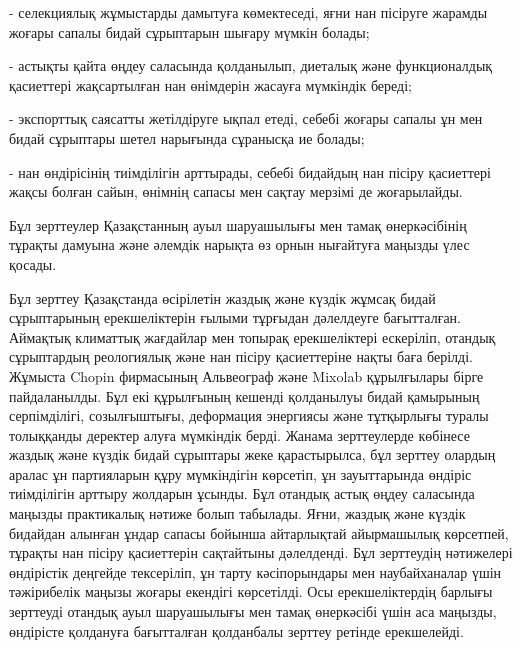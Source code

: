 \begin{multicols}{2}
- селекциялық жұмыстарды дамытуға көмектеседі, яғни нан пісіруге жарамды
жоғары сапалы бидай сұрыптарын шығару мүмкін болады;

- астықты қайта өңдеу саласында қолданылып, диеталық және функционалдық
қасиеттері жақсартылған нан өнімдерін жасауға мүмкіндік береді;

- экспорттық саясатты жетілдіруге ықпал етеді, себебі жоғары сапалы ұн
мен бидай сұрыптары шетел нарығында сұранысқа ие болады;

- нан өндірісінің тиімділігін арттырады, себебі бидайдың нан пісіру
қасиеттері жақсы болған сайын, өнімнің сапасы мен сақтау мерзімі де
жоғарылайды.

Бұл зерттеулер Қазақстанның ауыл шаруашылығы мен тамақ өнеркәсібінің
тұрақты дамуына және әлемдік нарықта өз орнын нығайтуға маңызды үлес
қосады.

Бұл зерттеу Қазақстанда өсірілетін жаздық және күздік жұмсақ бидай
сұрыптарының ерекшеліктерін ғылыми тұрғыдан дәлелдеуге бағытталған.
Аймақтық климаттық жағдайлар мен топырақ ерекшеліктері ескеріліп,
отандық сұрыптардың реологиялық және нан пісіру қасиеттеріне нақты баға
берілді. Жұмыста Chopin фирмасының Альвеограф және Mixolab құрылғылары
бірге пайдаланылды. Бұл екі құрылғының кешенді қолданылуы бидай
қамырының серпімділігі, созылғыштығы, деформация энергиясы және
тұтқырлығы туралы толыққанды деректер алуға мүмкіндік берді. Жанама
зерттеулерде көбінесе жаздық және күздік бидай сұрыптары жеке
қарастырылса, бұл зерттеу олардың аралас ұн партияларын құру мүмкіндігін
көрсетіп, ұн зауыттарында өндіріс тиімділігін арттыру жолдарын ұсынды.
Бұл отандық астық өңдеу саласында маңызды практикалық нәтиже болып
табылады. Яғни, жаздық және күздік бидайдан алынған ұндар сапасы бойынша
айтарлықтай айырмашылық көрсетпей, тұрақты нан пісіру қасиеттерін
сақтайтыны дәлелденді. Бұл зерттеудің нәтижелері өндірістік деңгейде
тексеріліп, ұн тарту кәсіпорындары мен наубайханалар үшін тәжірибелік
маңызы жоғары екендігі көрсетілді. Осы ерекшеліктердің барлығы зерттеуді
отандық ауыл шаруашылығы мен тамақ өнеркәсібі үшін аса маңызды,
өндірісте қолдануға бағытталған қолданбалы зерттеу ретінде ерекшелейді.


\end{multicols}
